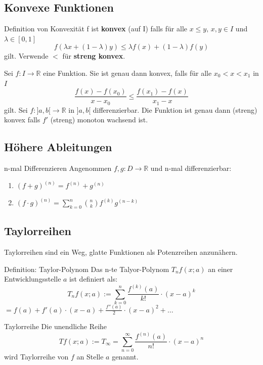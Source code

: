 \documentclass[a4paper,10pt]{article}
\def\sumn{\sum_{n=0}^\infty}
\def\R{\mathbb{R}}
\begin{document}
\subsection{Konvexe Funktionen}
\begin{mainbox}{Definition von Konvexität}
  f ist \textbf{konvex} (auf I) falls für alle $x \leq y,\, x,y\in I$ und $\lambda \in [0,1]$ \[f(\lambda x + (1-\lambda)y) \leq \lambda f(x) + (1-\lambda)f(y)\] gilt. Verwende $<$ für \textbf{streng konvex}.
\end{mainbox}
Sei $f: I \to \R$ eine Funktion. Sie ist genau dann konvex, falls für alle $x_0 < x < x_1$ in $I$ \[\frac{f(x)-f(x_0)}{x-x_0}\leq \frac{f(x_1)-f(x)}{x_1-x}\] gilt. Sei $f:]a,b[ \to \R$ in $]a,b[$ differenzierbar. Die Funktion ist genau dann (streng) konvex falls $f'$ (streng) monoton wachsend ist.

\subsection{Höhere Ableitungen}
\begin{mainbox}{n-mal Differenzieren}
  Angenommen $f,g: D\to \R$ und n-mal differenzierbar:
  \begin{enumerate}[leftmargin=*]
    \item $(f+g)^{(n)} = f^{(n)} + g^{(n)}$
    \item $(f\cdot g)^{(n)} = \sum\limits_{k=0}^{n}\binom{n}{k}f^{(k)}g^{(n-k)}$ 
  \end{enumerate}
\end{mainbox}

\subsection{Taylorreihen}
Taylorreihen sind ein Weg, glatte Funktionen als Potenzreihen anzunähern.

\begin{subbox}{Definition: Taylor-Polynom}
 Das n-te Talyor-Polynom $T_n f(x; a)$ an einer Entwicklungsstelle $a$ ist definiert als:
 $$T_n f(x; a) := \sum_{k=0}^{n} \frac{f^{(k)} (a)}{k!} \cdot (x - a)^k$$ 
 $ = f(a) + f'(a) \cdot (x-a) + \frac{f''(a)}{2} \cdot (x - a)^2 + \ldots$
\end{subbox}

\begin{mainbox}{Taylorreihe}
 Die unendliche Reihe
 $$Tf(x;a) := T_\infty = \sumn \frac{f^{(n)}(a)}{n!} \cdot (x-a)^n$$
 wird Taylorreihe von $f$ an Stelle $a$ genannt.
\end{mainbox}
\end{document}

